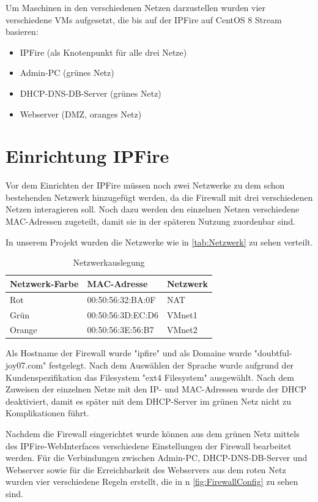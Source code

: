 \documentclass[a4paper,
    11pt,
    headings=small,
    ngerman,
    listof=totoc,
    numbers=noenddot]{scrreprt}[2021/11/13]
\begin{document}
Um Maschinen in den verschiedenen Netzen darzustellen wurden vier verschiedene \acp{VM} aufgesetzt, die bis auf der IPFire auf CentOS 8 Stream basieren:

\begin{itemize}
  \item IPFire (als Knotenpunkt für alle drei Netze)
  \item Admin-PC (grünes Netz)
  \item \ac{DHCP}-\ac{DNS}-\ac{DB}-Server (grünes Netz)
  \item Webserver (\ac{DMZ}, oranges Netz)
\end{itemize}


\section{Einrichtung IPFire}

Vor dem Einrichten der IPFire müssen noch zwei Netzwerke zu dem schon bestehenden Netzwerk hinzugefügt werden, da die Firewall mit drei verschiedenen Netzen interagieren soll. Noch dazu werden den einzelnen Netzen verschiedene MAC-Adressen zugeteilt, damit sie in der späteren Nutzung zuordenbar sind.

In unserem Projekt wurden die Netzwerke wie in \vref{tab:Netzwerk} zu sehen verteilt.

\begin{table}[htbp]
  \centering
  \renewcommand{\arraystretch}{1.25}
  \caption{Netzwerkauslegung}
  \begin{tabular}{lll}
    Netzwerk-Farbe & MAC-Adresse       & Netzwerk \\
    \hline
    Rot            & 00:50:56:32:BA:0F & NAT      \\
    Grün           & 00:50:56:3D:EC:D6 & VMnet1   \\
    Orange         & 00:50:56:3E:56:B7 & VMnet2   \\
  \end{tabular}
  \label{tab:Netzwerk}
\end{table}

Als Hostname der Firewall wurde "ipfire" und als Domaine wurde "doubtful-joy07.com" festgelegt.
Nach dem Auswählen der Sprache wurde aufgrund der Kundenspezifikation das Filesystem "ext4 Filesystem" ausgewählt. Nach dem Zuweisen der einzelnen Netze mit den IP- und MAC-Adressen wurde der \ac{DHCP} deaktiviert, damit es später mit dem \ac{DHCP}-Server im grünen Netz nicht zu Komplikationen führt.

Nachdem die Firewall eingerichtet wurde können aus dem grünen Netz mittels des IPFire-WebInterfaces verschiedene Einstellungen der Firewall
bearbeitet werden. Für die Verbindungen zwischen Admin-PC, \ac{DHCP}-\ac{DNS}-\ac{DB}-Server und Webserver sowie für die Erreichbarkeit des Webservers aus dem roten Netz wurden vier verschiedene Regeln erstellt, die in n \vref{fig:FirewallConfig} zu sehen sind.
\end{document}
